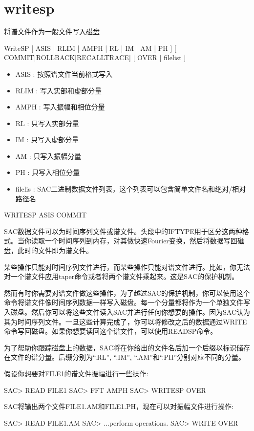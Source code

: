 \section{writesp}
\label{cmd:writesp}

将谱文件作为一般文件写入磁盘

WriteSP [ ASIS | RLIM | AMPH | RL | IM | AM | PH ] [ COMMIT|ROLLBACK|RECALLTRACE]  [ OVER | filelist ]
 
\begin{itemize}
\item ASIS :  按照谱文件当前格式写入 
\item RLIM :  写入实部和虚部分量 
\item AMPH :  写入振幅和相位分量 
\item RL :  只写入实部分量 
\item IM :  只写入虚部分量 
\item AM :  只写入振幅分量 
\item PH :  只写入相位分量 
\item filelis :  SAC二进制数据文件列表，这个列表可以包含简单文件名和绝对/相对路径名
\end{itemize}

WRITESP ASIS COMMIT

SAC数据文件可以为时间序列文件或谱文件。头段中的IFTYPE用于区分这两种格式。当你读取一个时间序列到内存，对其做快速Fourier变换，然后将数据写回磁盘，此时的文件即为谱文件。

某些操作只能对时间序列文件进行，而某些操作只能对谱文件进行。比如，你无法对一个谱文件应用taper命令或者将两个谱文件乘起来。这是SAC的保护机制。

然而有时你需要对谱文件做这些操作，为了越过SAC的保护机制，你可以使用这个命令将谱文件像时间序列数据一样写入磁盘。每一个分量都将作为一个单独文件写入磁盘。然后你可以将这些文件读入SAC并进行任何你想要的操作。因为SAC认为其为时间序列文件。一旦这些计算完成了，你可以将修改之后的数据通过WRITE命令写回磁盘。如果你想要读回这个谱文件，可以使用READSP命令。

为了帮助你跟踪磁盘上的数据，SAC将在你给出的文件名后加一个后缀以标识储存在文件的谱分量。后缀分别为``.RL'', ``.IM'', ``.AM''和``.PH''分别对应不同的分量。

假设你想要对FILE1的谱文件振幅进行一些操作:
\begin{SACCode}
SAC> READ FILE1
SAC> FFT AMPH
SAC> WRITESP OVER
\end{SACCode}

SAC将输出两个文件FILE1.AM和FILE1.PH，现在可以对振幅文件进行操作:
\begin{SACCode}
SAC> READ FILE1.AM
SAC> ...perform operations.
SAC> WRITE OVER
\end{SACCode}

